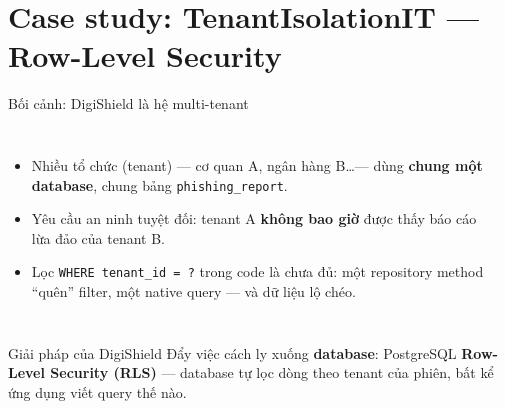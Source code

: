 \documentclass[aspectratio=169,12pt]{beamer}
\begin{document}
\section{Case study: TenantIsolationIT --- Row-Level Security}

\begin{frame}[shrink]{Bối cảnh: DigiShield là hệ multi-tenant}
  \begin{columns}
    \begin{itemize}\small
      \item Nhiều tổ chức (tenant) --- cơ quan A, ngân hàng B\ldots --- dùng
        \textbf{chung một database}, chung bảng \texttt{phishing\_report}.
      \item Yêu cầu an ninh tuyệt đối: tenant A \textbf{không bao giờ} được
        thấy báo cáo lừa đảo của tenant B.
      \item Lọc \texttt{WHERE tenant\_id = ?} trong code là chưa đủ: một
        repository method ``quên'' filter, một native query --- và dữ liệu
        lộ chéo.
    \end{itemize}
    \begin{center}
    \end{center}
  \end{columns}
  \vspace{0.2em}
  \begin{block}{Giải pháp của DigiShield}
    Đẩy việc cách ly xuống \textbf{database}: PostgreSQL
    \textbf{Row-Level Security (RLS)} --- database tự lọc dòng theo tenant
    của phiên, bất kể ứng dụng viết query thế nào.
  \end{block}
\end{frame}
\end{document}

